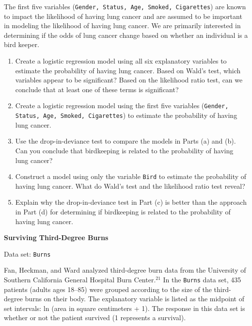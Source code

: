 \documentclass[
]{report}
\begin{document}
\begin{list}{E..}{ \setlength{\itemsep}{1.2em}}
The first five variables (\texttt{Gender, Status, Age, Smoked, Cigarettes}) are known to impact the likelihood of having lung cancer and are assumed to be important in modeling the likelihood of having lung cancer. We are primarily interested in determining if the odds of lung cancer change based on whether an individual is a bird keeper.

  \begin{enumerate}
    \item Create a logistic regression model using all six explanatory variables to estimate the probability of having lung cancer. Based on Wald’s test, which variables appear to be significant? Based on the likelihood ratio test, can we conclude that at least one of these terms is significant?
    \item Create a logistic regression model using the first five variables (\texttt{Gender, Status, Age, Smoked, Cigarettes}) to estimate the probability of having lung cancer. 
    \item Use the drop-in-deviance test to compare the models in Parts (a) and (b). Can you conclude that birdkeeping is related to the probability of having lung cancer?
    \item Construct a model using only the variable \texttt{Bird} to estimate the probability of having lung cancer. What do Wald’s test and the likelihood ratio test reveal?
    \item Explain why the drop-in-deviance test in Part (c) is better than the approach in Part (d) for determining if birdkeeping is related to the probability of having lung cancer.
  \end{enumerate}

  \item \textbf{Surviving Third-Degree Burns}

Data set: \texttt{Burns}

Fan, Heckman, and Ward analyzed third-degree burn data from the University of Southern California General Hospital Burn Center.$^{21}$ In the \texttt{Burns} data set, 435 patients (adults ages 18–85) were grouped according to the size of the third-degree burns on their body. The explanatory variable is listed as the midpoint of set intervals: ln (area in square centimeters + 1). The response in this data set is whether or not the patient survived (1 represents a survival).


\end{list}
\end{document}
